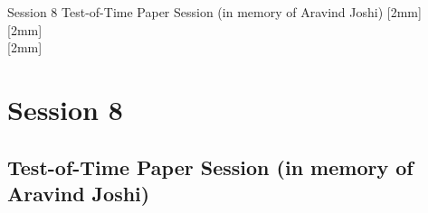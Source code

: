 \clearpage
{}
\renewcommand{\arraystretch}{1.5}
\begin{OneSessionOverview}{Session 8}{\daydateyear}
  {Test-of-Time Paper Session (in memory of Aravind Joshi)}
  {\TrackBLoc}
  [2mm]
  \\
  \hline
  [2mm]
  \\
  \hline
  [2mm]
  \\
  \hline
\end{OneSessionOverview}

\newpage
\section*{Session 8}
\subsection{Test-of-Time Paper Session (in memory of Aravind Joshi)}
\TrackBLoc\hfill{}
\clearpage


